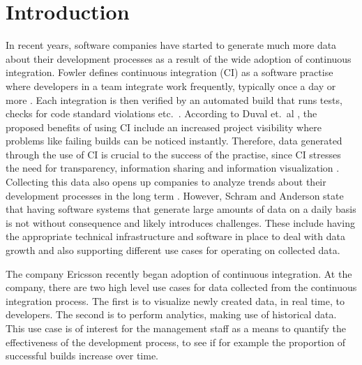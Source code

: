 \chapter{Introduction}
\label{chap:Introduction}

In recent years, software companies have started to generate much more data about their development processes as a result of the wide adoption of continuous integration. Fowler \cite{FowlerCI} defines continuous integration (CI) as a software practise where developers in a team integrate work frequently, typically once a day or more \cite{FowlerCI}. Each integration is then verified by an automated build that runs tests, checks for code standard violations etc.\ \cite{FowlerCI}. According to Duval et.\ al \cite{CIbook}, the proposed benefits of using CI include an increased project visibility where problems like failing builds can be noticed instantly. Therefore, data generated through the use of CI is crucial to the success of the practise, since CI stresses the need for transparency, information sharing and information visualization \cite{FowlerCI, CIbook}. Collecting this data also opens up companies to analyze trends about their development processes in the long term \cite{bigDataMane, CIbook}. However, Schram and Anderson \cite{MySQLToNoSQL} state that having software systems that generate large amounts of data on a daily basis is not without consequence and likely introduces challenges. These include having the appropriate technical infrastructure and software in place to deal with data growth and also supporting different use cases for operating on collected data.

The company Ericsson recently began adoption of continuous integration. At the company, there are two high level use cases for data collected from the continuous integration process. The first is to visualize newly created data, in real time, to developers. The second is to perform analytics, making use of historical data. This use case is of interest for the management staff as a means to quantify the effectiveness of the development process, to see if for example the proportion of successful builds increase over time.



